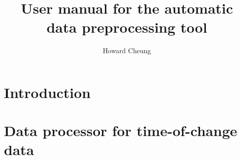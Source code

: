 \documentclass[12pt,a4paper]{article}
\author{Howard Cheung}
\title{User manual for the automatic data preprocessing tool}
\begin{document}
\maketitle

\section{Introduction}

\section{Data processor for time-of-change data}
\end{document}
